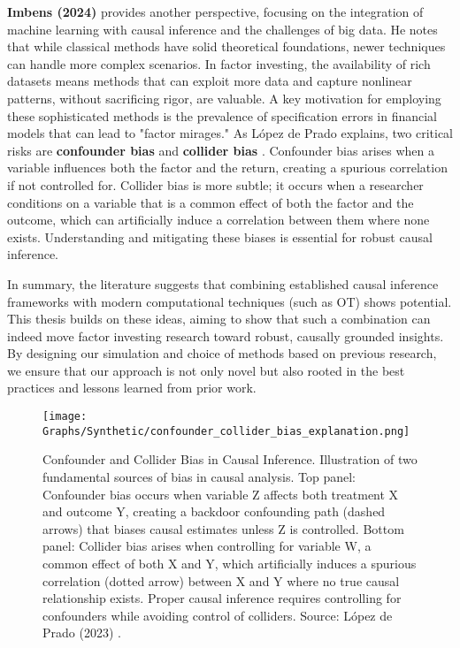\textbf{Imbens (2024)} provides another perspective, focusing on the integration of machine learning with causal inference and the challenges of big data\cite{Imbens24}. He notes that while classical methods have solid theoretical foundations, newer techniques can handle more complex scenarios. In factor investing, the availability of rich datasets means methods that can exploit more data and capture nonlinear patterns, without sacrificing rigor, are valuable. A key motivation for employing these sophisticated methods is the prevalence of specification errors in financial models that can lead to "factor mirages." As López de Prado explains, two critical risks are \textbf{confounder bias} and \textbf{collider bias} \cite{LopezDePrado25}. Confounder bias arises when a variable influences both the factor and the return, creating a spurious correlation if not controlled for. Collider bias is more subtle; it occurs when a researcher conditions on a variable that is a common effect of both the factor and the outcome, which can artificially induce a correlation between them where none exists. Understanding and mitigating these biases is essential for robust causal inference.

In summary, the literature suggests that combining established causal inference frameworks with modern computational techniques (such as OT) shows potential. This thesis builds on these ideas, aiming to show that such a combination can indeed move factor investing research toward robust, causally grounded insights. By designing our simulation and choice of methods based on previous research, we ensure that our approach is not only novel but also rooted in the best practices and lessons learned from prior work.

\begin{figure}[ht]
\centering
\texttt{[image: Graphs/Synthetic/confounder\_collider\_bias\_explanation.png]}
\caption{Confounder and Collider Bias in Causal Inference. Illustration of two fundamental sources of bias in causal analysis. Top panel: Confounder bias occurs when variable Z affects both treatment X and outcome Y, creating a backdoor confounding path (dashed arrows) that biases causal estimates unless Z is controlled. Bottom panel: Collider bias arises when controlling for variable W, a common effect of both X and Y, which artificially induces a spurious correlation (dotted arrow) between X and Y where no true causal relationship exists. Proper causal inference requires controlling for confounders while avoiding control of colliders. Source: López de Prado (2023) \cite{Lopez23}.}
\label{fig:confounder_collider_bias}
\end{figure}